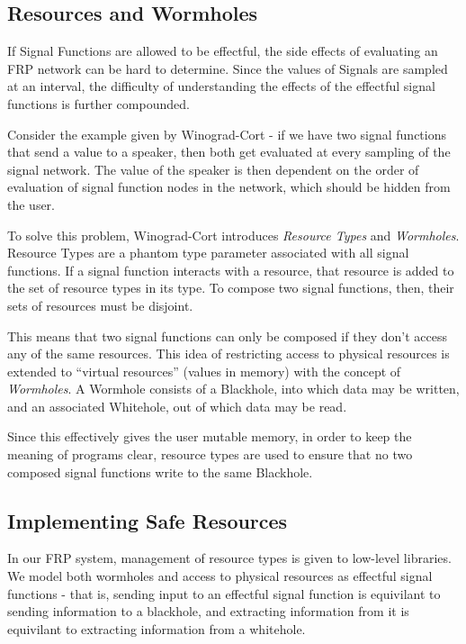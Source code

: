 \documentclass[twocolumn,11pt,english]{article}
\begin{document}
\subsection{Resources and Wormholes}
If Signal Functions are allowed to be effectful, the side effects of evaluating an FRP network can be hard to determine. Since the values of Signals are sampled at an interval, the difficulty of understanding the effects of the effectful signal functions is further compounded. 

Consider the example given by Winograd-Cort\cite{WinogradCort2012HS} - if we have two signal functions that send a value to a speaker, then both get evaluated at every sampling of the signal network. The value of the speaker is then dependent on the order of evaluation of signal function nodes in the network, which should be hidden from the user. 

To solve this problem, Winograd-Cort introduces \textit{Resource Types} and \textit{Wormholes}. Resource Types are a phantom type parameter associated with all signal functions. If a signal function interacts with a resource, that resource is added to the set of resource types in its type. To compose two signal functions, then, their sets of resources must be disjoint. 

This means that two signal functions can only be composed if they don't access any of the same resources. This idea of restricting access to physical resources is extended to ``virtual resources'' (values in memory) with the concept of \textit{Wormholes}. A Wormhole consists of a Blackhole, into which data may be written, and an associated Whitehole, out of which data may be read. 

Since this effectively gives the user mutable memory, in order to keep the meaning of programs clear, resource types are used to ensure that no two composed signal functions write to the same Blackhole. 

\subsection{Implementing Safe Resources}
In our FRP system, management of resource types is given to low-level libraries. We model both wormholes and access to physical resources as effectful signal functions - that is, sending input to an effectful signal function is equivilant to sending information to a blackhole, and extracting information from it is equivilant to extracting information from a whitehole.
\end{document}
